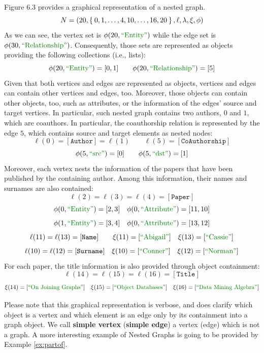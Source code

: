 \begin{example}
Figure 6.3 provides a graphical representation of a nested graph.
\[N=(20,\Set{0,1,\dots,4,10,\dots,16,20},\ell,\lambda,\xi,\phi)\]
As we can see, the vertex set is $\phi(20,\ONTA)$ while the edge set is $\phi(30,\RELA)$. Consequently, those sets are represented as objects providing the following collections (i.e., lists):
\[\phi(20,\ONTA)=[0,1]\qquad \phi(20,\RELA)=[5]\]
Given that both vertices and edges are represented as objects, vertices and edges can contain other vertices and edges, too. Moreover, those objects can contain other objects, too, such as attributes, or the information of the edges' source and target vertices. In particular, such nested graph contains two authors, $0$ and $1$, which are coauthors. 
In particular, the coauthorship relation is represented by the edge $5$, which contains source and target elements as nested nodes:
\[\ell(0)=[\texttt{Author}]=\ell(1)\qquad \ell(5)=[\texttt{CoAuthorship}]\]
\[\phi(5,\SRC)=[0]\qquad \phi(5,\DST)=[1]\]
Moreover, each vertex nests the information of the papers that have been published by the containing author. Among this information, their names and surnames are also contained:
\[ \ell(2)=\ell(3)=\ell(4)=[\texttt{Paper}]\]
\[\phi(0,\ONTA)=[2,3]\quad \phi(0,\ATTR)=[11,10]\]
\[\phi(1,\ONTA)=[3,4]\quad \phi(0,\ATTR)=[13,12]\]
\[\ell(11)=\ell(13)=[\texttt{Name}]\qquad \xi(11)=[\mstr{Abigail}]\quad \xi(13)=[\mstr{Cassie}]\]
\[\ell(10)=\ell(12)=[\texttt{Surname}]\quad \xi(10)=[\mstr{Conner}]\quad \xi(12)=[\mstr{Norman}]\]
For each paper, the title information is also provided through object containment:
\[\ell(14)=\ell(15)=\ell(16)=[\texttt{Title}]\]
\[\xi(14)=[\mstr{On Joining Graphs}]\quad \xi(15)=[\mstr{Object Databases}]\quad \xi(16)=[\mstr{Data Mining Algebra}]\]
\end{example}

Please note that this graphical representation is verbose, and does  clarify which object is a vertex and which element is an edge only by its containment into a graph object. We call \textbf{simple vertex} (\textbf{simple edge}) a vertex (edge) which is not a graph. A more interesting example of Nested Graphs is going to be provided by Example \vref{ex:partof}.

